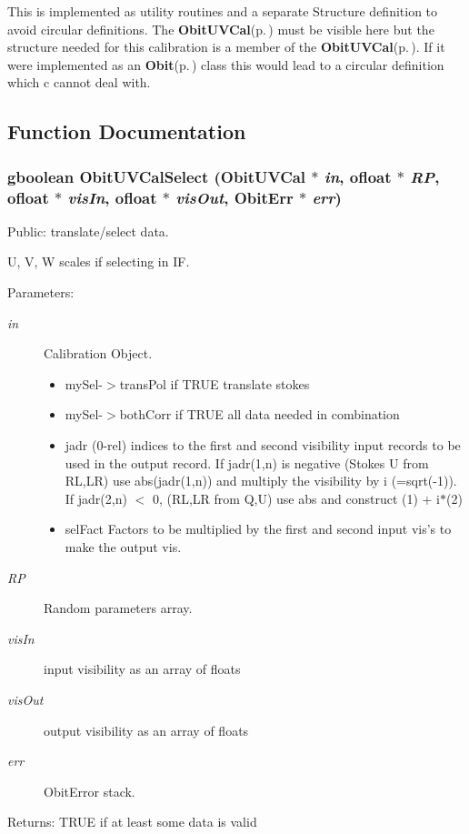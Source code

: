 This is implemented as utility routines and a separate Structure definition to avoid circular definitions. The {\bf Obit\-UVCal}{\rm (p.\,\pageref{structObitUVCal})} must be visible here but the structure needed for this calibration is a member of the {\bf Obit\-UVCal}{\rm (p.\,\pageref{structObitUVCal})}. If it were implemented as an {\bf Obit}{\rm (p.\,\pageref{structObit})} class this would lead to a circular definition which c cannot deal with.

\subsection{Function Documentation}
\subsubsection{\setlength{\rightskip}{0pt plus 5cm}gboolean Obit\-UVCal\-Select ({\bf Obit\-UVCal} $\ast$ {\em in}, {\bf ofloat} $\ast$ {\em RP}, {\bf ofloat} $\ast$ {\em vis\-In}, {\bf ofloat} $\ast$ {\em vis\-Out}, {\bf Obit\-Err} $\ast$ {\em err})}\label{ObitUVCalSelect_8h_a1}


Public: translate/select data. 

U, V, W scales if selecting in IF. \begin{Desc}
\item[Parameters:]
\begin{description}
\item[{\em in}]Calibration Object. \begin{itemize}
\item my\-Sel-$>$trans\-Pol if TRUE translate stokes \item my\-Sel-$>$both\-Corr if TRUE all data needed in combination \item jadr (0-rel) indices to the first and second visibility input records to be used in the output record. If jadr(1,n) is negative (Stokes U from RL,LR) use abs(jadr(1,n)) and multiply the visibility by i (=sqrt(-1)). If jadr(2,n) $<$ 0, (RL,LR from Q,U) use abs and construct (1) + i$\ast$(2) \item sel\-Fact Factors to be multiplied by the first and second input vis's to make the output vis. \end{itemize}
\item[{\em RP}]Random parameters array. \item[{\em vis\-In}]input visibility as an array of floats \item[{\em vis\-Out}]output visibility as an array of floats \item[{\em err}]Obit\-Error stack. \end{description}
\end{Desc}
\begin{Desc}
\item[Returns:]TRUE if at least some data is valid \end{Desc}
